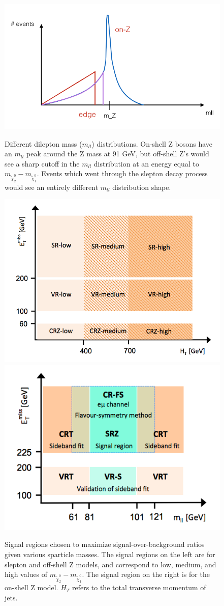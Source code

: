 \documentclass{article}
\begin{document}
\begin{figure}[t]
    \centering
    \includegraphics[width=0.5\linewidth]{images/mll.png}
    \caption{Different dilepton mass ($m_{ll}$) distributions. On-shell Z bosons have an $m_{ll}$ peak around the Z mass at 91 GeV, but off-shell Z's would see a sharp cutoff in the $m_{ll}$ distribution at an energy equal to $m_{\tilde{\chi}^0_2} - m_{\tilde{\chi}^0_1}$. Events which went through the slepton decay process would see an entirely different $m_{ll}$ distribution shape.}
    \label{mll}
    
    \centering
    \includegraphics[width=0.45\linewidth]{images/slepton_signal_regions.png}
    \includegraphics[width=0.45\linewidth]{images/Z_signal_regions.png}
    \caption{Signal regions chosen to maximize signal-over-background ratios given various sparticle masses. The signal regions on the left are for slepton and off-shell Z models, and correspond to low, medium, and high values of $m_{\tilde{\chi}^0_2} - m_{\tilde{\chi}^0_1}$. The signal region on the right is for the on-shell Z model. $H_T$ refers to the total transverse momentum of jets.}
    \label{signal_regions}
\end{figure}
\end{document}
